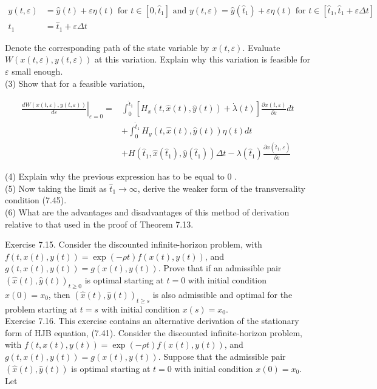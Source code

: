 \documentclass[\topdir/lecture_notes.tex]{subfiles}
\begin{document}
\[
\begin{aligned}
y(t, \varepsilon) & =\hat{y}(t)+\varepsilon \eta(t) \text { for } t \in\left[0, \hat{t}_{1}\right] \text { and } y(t, \varepsilon)=\hat{y}\left(\hat{t}_{1}\right)+\varepsilon \eta(t) \text { for } t \in\left[\hat{t}_{1}, \hat{t}_{1}+\varepsilon \Delta t\right] \\
t_{1} & =\hat{t}_{1}+\varepsilon \Delta t
\end{aligned}
\]

Denote the corresponding path of the state variable by $x(t, \varepsilon)$. Evaluate $W(x(t, \varepsilon), y(t, \varepsilon))$ at this variation. Explain why this variation is feasible for $\varepsilon$ small enough.\\
(3) Show that for a feasible variation,

\[
\begin{aligned}
\left.\frac{d W(x(t, \varepsilon), y(t, \varepsilon))}{d \varepsilon}\right|_{\varepsilon=0}= & \int_{0}^{\hat{t}_{1}}\left[H_{x}(t, \hat{x}(t), \hat{y}(t))+\dot{\lambda}(t)\right] \frac{\partial x(t, \varepsilon)}{\partial \varepsilon} d t \\
& +\int_{0}^{\hat{t}_{1}} H_{y}(t, \hat{x}(t), \hat{y}(t)) \eta(t) d t \\
& +H\left(\hat{t}_{1}, \hat{x}\left(\hat{t}_{1}\right), \hat{y}\left(\hat{t}_{1}\right)\right) \Delta t-\lambda\left(\hat{t}_{1}\right) \frac{\partial x\left(\hat{t}_{1}, \varepsilon\right)}{\partial \varepsilon}
\end{aligned}
\]

(4) Explain why the previous expression has to be equal to 0 .\\
(5) Now taking the limit as $\hat{t}_{1} \rightarrow \infty$, derive the weaker form of the transversality condition (7.45).\\
(6) What are the advantages and disadvantages of this method of derivation relative to that used in the proof of Theorem 7.13.

Exercise 7.15. Consider the discounted infinite-horizon problem, with $f(t, x(t), y(t))= \exp (-\rho t) f(x(t), y(t))$, and $g(t, x(t), y(t))=g(x(t), y(t))$. Prove that if an admissible pair $(\hat{x}(t), \hat{y}(t))_{t \geq 0}$ is optimal starting at $t=0$ with initial condition $x(0)=x_{0}$, then $(\hat{x}(t), \hat{y}(t))_{t \geq s}$ is also admissible and optimal for the problem starting at $t=s$ with initial condition $x(s)=x_{0}$.\\
Exercise 7.16. This exercise contains an alternative derivation of the stationary form of HJB equation, (7.41). Consider the discounted infinite-horizon problem, with $f(t, x(t), y(t))= \exp (-\rho t) f(x(t), y(t))$, and $g(t, x(t), y(t))=g(x(t), y(t))$. Suppose that the admissible pair $(\hat{x}(t), \hat{y}(t))$ is optimal starting at $t=0$ with initial condition $x(0)=x_{0}$. Let
\end{document}
